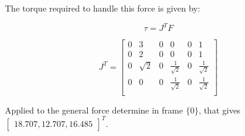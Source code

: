 \documentclass{exam}
\begin{document}
\begin{questions}
\begin{parts}
The torque required to handle this force is given by:

\begin{equation}
  \tau = J^{T}F
\end{equation}

\begin{equation}
  J^{T} = \begin{bmatrix}
    0 & 3        & 0 & 0                  & 0 & 1                  \\
    0 & 2        & 0 & 0                  & 0 & 1                  \\
    0 & \sqrt{2} & 0 & \frac{1}{\sqrt{2}} & 0 & \frac{1}{\sqrt{2}} \\
    0 & 0        & 0 & \frac{1}{\sqrt{2}} & 0 & \frac{1}{\sqrt{2}} \\
          \end{bmatrix}
\end{equation}

Applied to the general force determine in frame $\{0\}$, that gives $\begin{bmatrix}18.707, 12.707, 16.485\end{bmatrix}^{T}$. 

\end{parts}

\question

\begin{parts}

\end{parts}

\end{questions}
\end{document}
